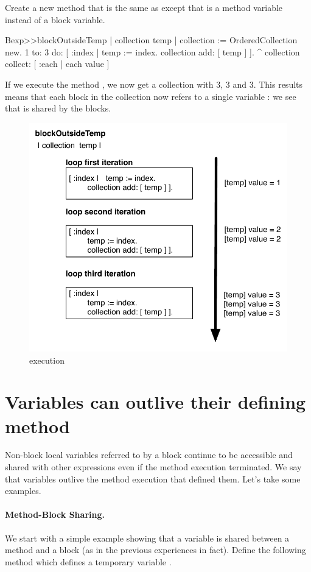 \documentclass[a4paper,10pt,twoside]{book}
\begin{document}
Create a new method that is the same as  except that  is a method variable instead of a block variable.

\begin{code}{}
Bexp>>blockOutsideTemp
	| collection temp |
	collection := OrderedCollection new.
	1 to: 3 do: [ :index | 
		temp := index.
		collection add: [ temp ] ].
	^ collection collect: [ :each | each value ]
\end{code}

If we execute the method , we now get a collection with 3, 3 and 3. This results means that each block in the collection now refers to a single variable : we see that  is shared by the blocks.

\begin{figure}
	\centering
		\includegraphics[width=0.7\linewidth]{blockClosureOutsideTemp}
	\caption{ execution}
	\label{fig:blockClosureOutsideTemp}
\end{figure}


\section{Variables can outlive their defining method}

Non-block local variables referred to by a block continue to be accessible and shared with other expressions even if the method execution terminated. We say that variables outlive the method execution that defined them.
Let's take some examples.

\paragraph{Method-Block Sharing.} We start with a simple example showing that a variable is shared between a method and a block (as in the previous experiences in fact). Define the following method  which defines a temporary variable .
\end{document}
